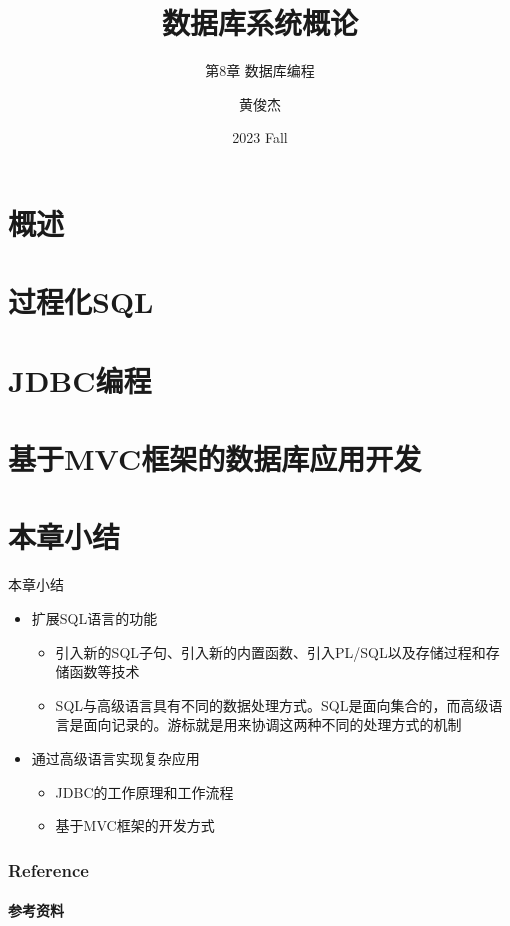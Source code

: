 \documentclass[aspectratio=169,t,10pt]{beamer}
\title{数据库系统概论}
\subtitle{第8章 数据库编程}
\author{黄俊杰}
\date{2023 Fall}
\begin{document}

\begin{frame}
\titlepage
\end{frame}


\section{概述}


\section{过程化SQL}


\section{JDBC编程}


\section{基于MVC框架的数据库应用开发}



\section{本章小结}
\begin{frame}{本章小结}
\begin{itemize}
    \item 扩展SQL语言的功能
    \begin{itemize}
        \item 引入新的SQL子句、引入新的内置函数、引入PL/SQL以及存储过程和存储函数等技术
        \item SQL与高级语言具有不同的数据处理方式。SQL是面向集合的，而高级语言是面向记录的。游标就是用来协调这两种不同的处理方式的机制
    \end{itemize}


    \item 通过高级语言实现复杂应用
    \begin{itemize}
        \item JDBC的工作原理和工作流程
        \item 基于MVC框架的开发方式
    \end{itemize}


\end{itemize}
    
\end{frame}

\appendix

\begin{frame}[t]
\frametitle{Reference}
\framesubtitle{参考资料}
\nocite{*}

\end{frame}
\end{document}
